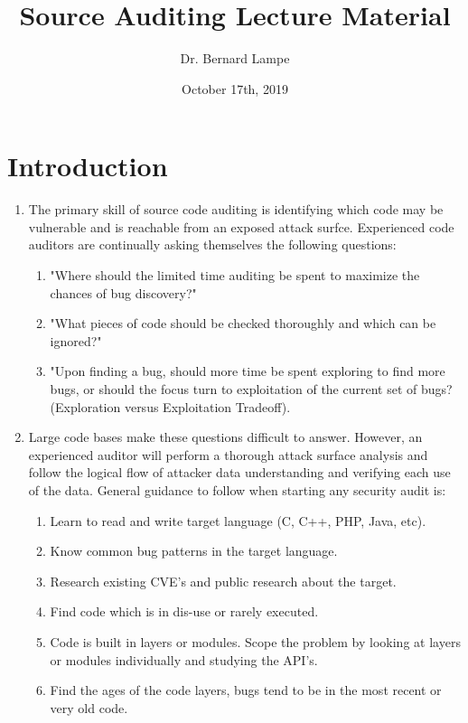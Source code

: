 \documentclass[12pt]{Training}
\title{Source Auditing Lecture Material}
\author{Dr. Bernard Lampe}
\date{October 17th, 2019}
\begin{document}
\maketitle


\section*{Introduction}
\begin{enumerate}
	\item The primary skill of source code auditing is identifying which code may be vulnerable and is reachable from an exposed attack surfce. Experienced code auditors are continually asking themselves the following questions:
		\begin{enumerate}
			\item "Where should the limited time auditing be spent to maximize the chances of bug discovery?"
		 	\item "What pieces of code should be checked thoroughly and which can be ignored?"
		 	\item "Upon finding a bug, should more time be spent exploring to find more bugs, or should the focus turn to exploitation of the current set of bugs? (Exploration versus Exploitation Tradeoff).
		\end{enumerate}
	\item Large code bases make these questions difficult to answer. However, an experienced auditor will perform a thorough attack surface analysis and follow the logical flow of attacker data understanding and verifying each use of the data. General guidance to follow when starting any security audit is:
	\begin{enumerate}
		\item Learn to read and write target language (C, C++, PHP, Java, etc).
		\item Know common bug patterns in the target language.
		\item Research existing CVE's and public research about the target.
		\item Find code which is in dis-use or rarely executed.
		\item Code is built in layers or modules. Scope the problem by looking at layers or modules individually and studying the API's.
		\item Find the ages of the code layers, bugs tend to be in the most recent or very old code.

\end{enumerate}
\end{enumerate}
\end{document}
